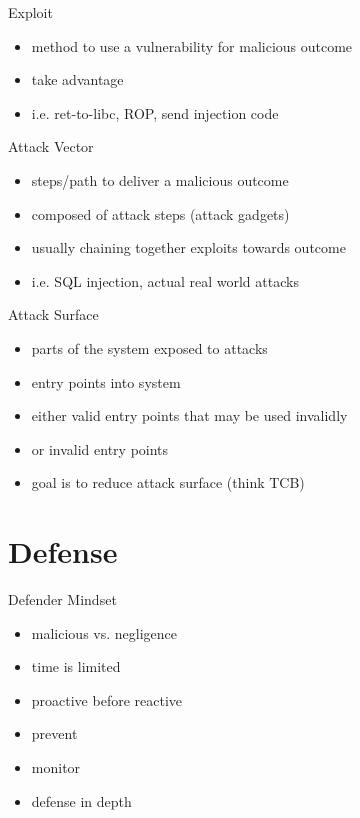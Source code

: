 \documentclass{curs}
\begin{document}
\begin{frame}{Exploit}
  \begin{itemize}
    \item method to use a vulnerability for malicious outcome
    \item take advantage
    \item i.e. ret-to-libc, ROP, send injection code
  \end{itemize}
\end{frame}

\begin{frame}{Attack Vector}
  \begin{itemize}
    \item steps/path to deliver a malicious outcome
    \item composed of attack steps (attack gadgets)
    \item usually chaining together exploits towards outcome
    \item i.e. SQL injection, actual real world attacks
  \end{itemize}
\end{frame}

\begin{frame}{Attack Surface}
  \begin{itemize}
    \item parts of the system exposed to attacks
    \item entry points into system
    \item either valid entry points that may be used invalidly
    \item or invalid entry points
    \item goal is to reduce attack surface (think TCB)
  \end{itemize}
\end{frame}


\section{Defense}

\begin{frame}{Defender Mindset}
  \begin{itemize}
    \item malicious vs. negligence
    \item time is limited
    \item proactive before reactive
    \item prevent
    \item monitor
    \item defense in depth
  \end{itemize}
\end{frame}
\end{document}

